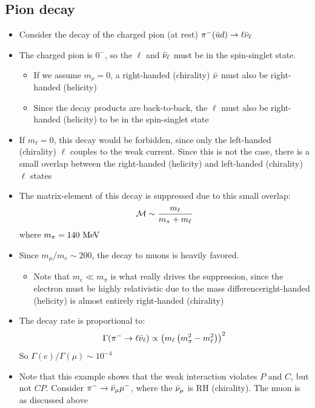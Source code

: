 \subsection{Pion decay}
\begin{itemize}
  \item Consider the decay of the charged pion (at rest) $\pi^-(\bar{u} d)\rightarrow \ell {\bar{\nu}}_\ell$
  \item The charged pion is $0^-$, so the $\ell$ and ${\bar{\nu}}_\ell$ must be in the spin-singlet state. 
  \begin{itemize}
    \item If we assume $m_\nu = 0$, a right-handed (chirality) ${\bar{\nu}}$ must also be right-handed (helicity)
    \item Since the decay products are back-to-back, the $\ell$ must also be right-handed (helicity) to be in the spin-singlet state
  \end{itemize}
  \item If $m_\ell = 0$, this decay would be forbidden, since only the left-handed (chirality) $\ell$ couples to the weak current. Since this is not the case, there is a small overlap between the right-handed (helicity) and left-handed (chirality) $\ell$ states
  \item The matrix-element of this decay is suppressed due to this small overlap:
  \begin{equation}
    \mathcal{M} \sim \frac{m_\ell}{m_\pi + m_\ell}
  \end{equation}
  where $m_\pi = 140~\text{MeV}$
  \item Since $m_\mu/m_e \sim 200$, the decay to muons is heavily favored.
  \begin{itemize}
    \item Note that $m_e \ll m_\pi$ is what really drives the suppression, since the electron must be highly relativistic due to the mass difference\thus right-handed (helicity) is almost entirely right-handed (chirality)
  \end{itemize}
  \item The decay rate is proportional to:
  \begin{equation}
    \Gamma (\pi^- \rightarrow \ell {\bar{\nu}}_\ell) \propto \left(m_\ell \left(m_\pi^2 - m_\ell^2\right) \right)^2
  \end{equation}
  So $\Gamma(e)/\Gamma(\mu) \sim 10^{-4}$
  \item Note that this example shows that the weak interaction violates $P$ and $C$, but not $CP$. Consider $\pi^-\rightarrow {\bar{\nu}}_\mu \mu^-$, where the ${\bar{\nu}}_\mu$ is RH (chirality). The muon is as discussed above
\end{itemize}

